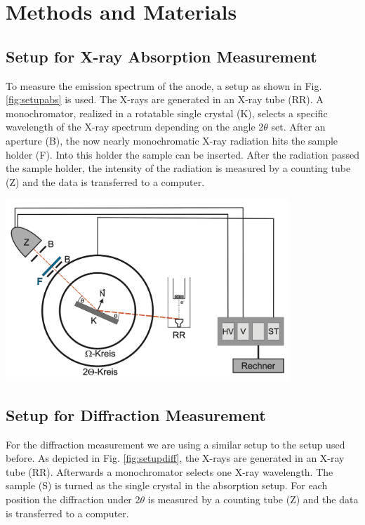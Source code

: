 
\chapter{Methods and Materials}
\label{chap:methods}


\section{Setup for X-ray Absorption Measurement}
\label{sec:SetupAbsorb}

To measure the emission spectrum of the anode, a setup as shown in Fig. \ref{fig:setupabs} is used. The X-rays are generated in an X-ray tube (RR). A monochromator, realized in a rotatable single crystal (K), 
selects a specific wavelength of the X-ray spectrum depending on the angle 2$\theta$ set. After an aperture (B), the now nearly monochromatic X-ray radiation hits the sample holder (F). Into this holder the sample
can be inserted. After the radiation passed the sample holder, the intensity of the radiation is measured by a counting tube (Z) and the data is transferred to a computer. \cite{Anleitung}

\begin{center}
    \captionsetup{type = figure}
    \includegraphics[width = 0.8\textwidth]{Pictures/SetupAbsorb.png}
    \label{fig:setupabs}
\end{center}

\newpage
\section{Setup for Diffraction Measurement}
\label{sec:SetupDiff}

For the diffraction measurement we are using a similar setup to the setup used before. As depicted in Fig. \ref{fig:setupdiff}, the X-rays are generated in an X-ray tube (RR). Afterwards a monochromator selects one X-ray wavelength. 
The sample (S) is turned as the single crystal in the absorption setup. For each position the diffraction under 2$\theta$ is measured by a counting tube (Z) and the data is transferred to a computer.

